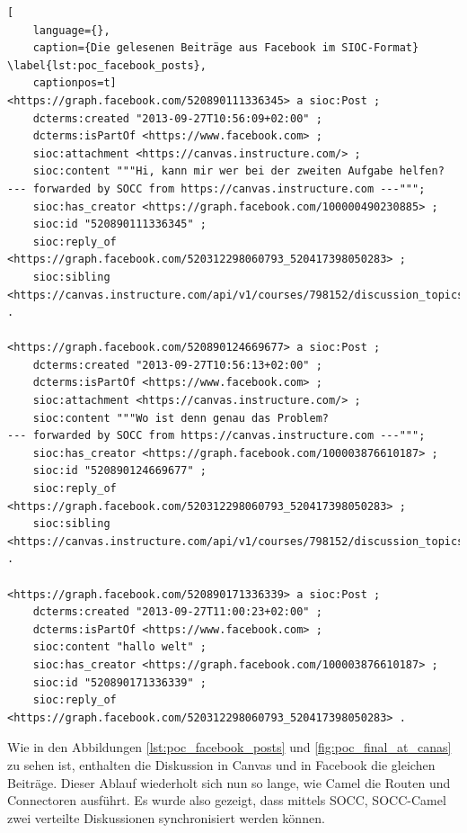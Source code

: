 \begin{lstlisting}[
    language={},
    caption={Die gelesenen Beiträge aus Facebook im SIOC-Format} \label{lst:poc_facebook_posts},
    captionpos=t]
<https://graph.facebook.com/520890111336345> a sioc:Post ;
    dcterms:created "2013-09-27T10:56:09+02:00" ;
    dcterms:isPartOf <https://www.facebook.com> ;
    sioc:attachment <https://canvas.instructure.com/> ;
    sioc:content """Hi, kann mir wer bei der zweiten Aufgabe helfen?
--- forwarded by SOCC from https://canvas.instructure.com ---""";
    sioc:has_creator <https://graph.facebook.com/100000490230885> ;
    sioc:id "520890111336345" ;
    sioc:reply_of <https://graph.facebook.com/520312298060793_520417398050283> ;
    sioc:sibling <https://canvas.instructure.com/api/v1/courses/798152/discussion_topics/1540697/entries/3284842> .

<https://graph.facebook.com/520890124669677> a sioc:Post ;
    dcterms:created "2013-09-27T10:56:13+02:00" ;
    dcterms:isPartOf <https://www.facebook.com> ;
    sioc:attachment <https://canvas.instructure.com/> ;
    sioc:content """Wo ist denn genau das Problem?
--- forwarded by SOCC from https://canvas.instructure.com ---""";
    sioc:has_creator <https://graph.facebook.com/100003876610187> ;
    sioc:id "520890124669677" ;
    sioc:reply_of <https://graph.facebook.com/520312298060793_520417398050283> ;
    sioc:sibling <https://canvas.instructure.com/api/v1/courses/798152/discussion_topics/1540697/entries/3284844> .

<https://graph.facebook.com/520890171336339> a sioc:Post ;
    dcterms:created "2013-09-27T11:00:23+02:00" ;
    dcterms:isPartOf <https://www.facebook.com> ;
    sioc:content "hallo welt" ;
    sioc:has_creator <https://graph.facebook.com/100003876610187> ;
    sioc:id "520890171336339" ;
    sioc:reply_of <https://graph.facebook.com/520312298060793_520417398050283> .
\end{lstlisting}

Wie in den Abbildungen \ref{lst:poc_facebook_posts} und \ref{fig:poc_final_at_canas} zu sehen ist, enthalten die Diskussion in Canvas und in Facebook die gleichen Beiträge. Dieser Ablauf wiederholt sich nun so lange, wie Camel die Routen und Connectoren ausführt. Es wurde also gezeigt, dass mittels SOCC, SOCC-Camel zwei verteilte Diskussionen synchronisiert werden können. 

